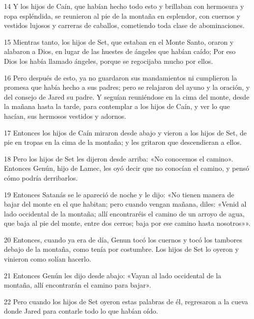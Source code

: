\par 14 Y los hijos de Caín, que habían hecho todo esto y brillaban con hermosura y ropa espléndida, se reunieron al pie de la montaña en esplendor, con cuernos y vestidos lujosos y carreras de caballos, cometiendo toda clase de abominaciones.

\par 15 Mientras tanto, los hijos de Set, que estaban en el Monte Santo, oraron y alabaron a Dios, en lugar de las huestes de ángeles que habían caído; Por eso Dios los había llamado ángeles, porque se regocijaba mucho por ellos.

\par 16 Pero después de esto, ya no guardaron sus mandamientos ni cumplieron la promesa que había hecho a sus padres; pero se relajaron del ayuno y la oración, y del consejo de Jared su padre. Y seguían reuniéndose en la cima del monte, desde la mañana hasta la tarde, para contemplar a los hijos de Caín, y ver lo que hacían, sus hermosos vestidos y adornos.

\par 17 Entonces los hijos de Caín miraron desde abajo y vieron a los hijos de Set, de pie en tropas en la cima de la montaña; y les gritaron que descendieran a ellos.

\par 18 Pero los hijos de Set les dijeron desde arriba: «No conocemos el camino». Entonces Genún, hijo de Lamec, les oyó decir que no conocían el camino, y pensó cómo podría derribarlos.

\par 19 Entonces Satanás se le apareció de noche y le dijo: «No tienen manera de bajar del monte en el que habitan; pero cuando vengan mañana, diles: «Venid al lado occidental de la montaña; allí encontraréis el camino de un arroyo de agua, que baja al pie del monte, entre dos cerros; baja por ese camino hasta nosotros»».

\par 20 Entonces, cuando ya era de día, Genun tocó los cuernos y tocó los tambores debajo de la montaña, como tenía por costumbre. Los hijos de Set lo oyeron y vinieron como solían hacerlo.

\par 21 Entonces Genún les dijo desde abajo: «Vayan al lado occidental de la montaña, allí encontrarán el camino para bajar».

\par 22 Pero cuando los hijos de Set oyeron estas palabras de él, regresaron a la cueva donde Jared para contarle todo lo que habían oído.

